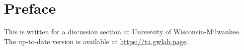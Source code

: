 
\chapter*{Preface}

This is written for a discussion section at University of Wisconsin-Milwaukee. The up-to-date version is available at
\href{https://ta.gwlab.page/}{https://ta.gwlab.page}.
